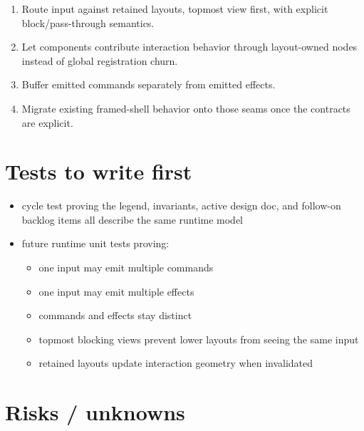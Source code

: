 \begin{enumerate}
  \begin{itemize}
  \tightlist
  \item
    terminal resize
  \item
    view push/pop
  \item
    content-size changes
  \item
    visibility/enablement changes
  \item
    scrollbar/overflow changes
  \end{itemize}
\item
  Route input against retained layouts, topmost view first, with explicit block/pass-through semantics.
\item
  Let components contribute interaction behavior through layout-owned nodes instead of global registration churn.
\item
  Buffer emitted commands separately from emitted effects.
\item
  Migrate existing framed-shell behavior onto those seams once the contracts are explicit.
\end{enumerate}

\section{Tests to write first}\label{record-149-tests-to-write-first}

\begin{itemize}
\tightlist
\item
  cycle test proving the legend, invariants, active design doc, and follow-on backlog items all describe the same runtime model
\item
  future runtime unit tests proving:

  \begin{itemize}
  \tightlist
  \item
    one input may emit multiple commands
  \item
    one input may emit multiple effects
  \item
    commands and effects stay distinct
  \item
    topmost blocking views prevent lower layouts from seeing the same input
  \item
    retained layouts update interaction geometry when invalidated
  \end{itemize}
\end{itemize}

\section{Risks / unknowns}\label{record-149-risks-unknowns}

